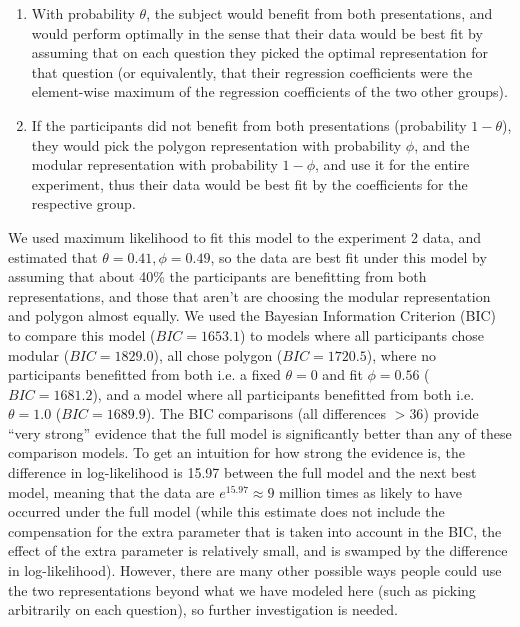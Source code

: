 \documentclass[man,10pt]{apa6}
\begin{document}
\begin{enumerate}
\item With probability $\theta$, the subject would benefit from both presentations, and would perform optimally in the sense that their data would be best fit by assuming that on each question they picked the optimal representation for that question (or equivalently, that their regression coefficients were the element-wise maximum of the regression coefficients of the two other groups). 
\item If the participants did not benefit from both presentations (probability $1-\theta$), they would pick the polygon representation with probability $\phi$, and the modular representation with probability $1-\phi$, and use it for the entire experiment, thus their data would be best fit by the coefficients for the respective group.
\end{enumerate}
We used maximum likelihood to fit this model to the experiment 2 data, and estimated that $\theta = 0.41, \phi = 0.49$, so the data are best fit under this model by assuming that about 40\% the participants are benefitting from both representations, and those that aren't are choosing the modular representation and polygon almost equally. We used the Bayesian Information Criterion (BIC) to compare this model ($BIC = 1653.1$) to models where all participants chose modular ($BIC=1829.0$), all chose polygon ($BIC = 1720.5$), where no participants benefitted from both i.e. a fixed $\theta = 0$ and fit $\phi = 0.56$ ($BIC = 1681.2$), and a model where all participants benefitted from both i.e. $\theta = 1.0$ ($BIC = 1689.9$). The BIC comparisons (all differences $> 36$) provide ``very strong'' \cite{Kass1995} evidence that the full model is significantly better than any of these comparison models. To get an intuition for how strong the evidence is, the difference in log-likelihood is 15.97 between the full model and the next best model, meaning that the data are $e^{15.97} \approx 9$ million times as likely to have occurred under the full model (while this estimate does not include the compensation for the extra parameter that is taken into account in the BIC, the effect of the extra parameter is relatively small, and is swamped by the difference in log-likelihood). However, there are many other possible ways people could use the two representations beyond what we have modeled here (such as picking arbitrarily on each question), so further investigation is needed.\par
\end{document}
